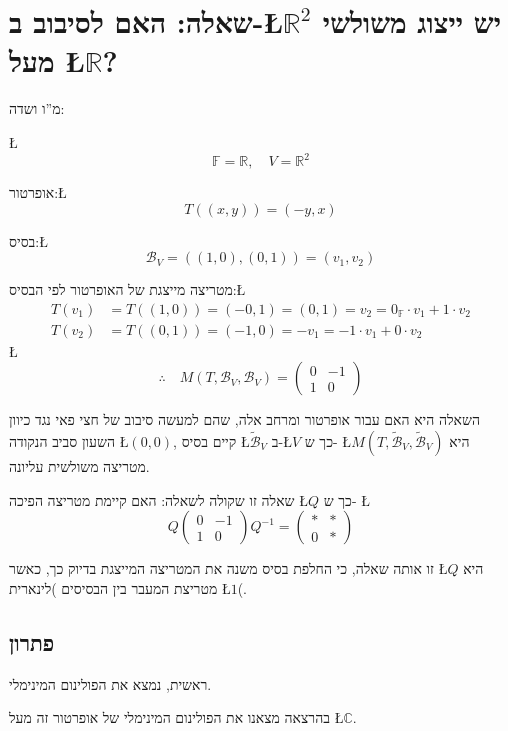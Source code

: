 \documentclass[english,hebrew]{article}
\begin{document}
\section{שאלה: האם לסיבוב ב-\L{$\mathbb{R}^{2}$} יש ייצוג משולשי מעל \L{$\mathbb{R}$}?}

מ\textquotedblright ו ושדה:

\L{%
\[
\mathbb{F}=\mathbb{R},\quad V=\mathbb{R}^{2}
\]
}%

אופרטור:\L{%
\[
T((x,y))=(-y,x)
\]
}%

בסיס:\L{%
\[
\mathcal{B}_{V}=((1,0),(0,1))=(v_{1},v_{2})
\]
}%

מטריצה מייצגת של האופרטור לפי הבסיס:\L{%
\begin{align*}
T(v_{1}) & =T\left((1,0)\right)=\left(-0,1\right)=\left(0,1\right)=v_{2}=0_{\mathbb{F}}\cdot v_{1}+1\cdot v_{2}\\
T(v_{2}) & =T\left((0,1)\right)=\left(-1,0\right)=-v_{1}=-1\cdot v_{1}+0\cdot v_{2}
\end{align*}
}%
\L{%
\[
\therefore\quad M(T,\mathcal{B}_{V},\mathcal{B}_{V})=\begin{pmatrix}0 & -1\\
1 & 0
\end{pmatrix}
\]
}%

השאלה היא האם עבור אופרטור ומרחב אלה, שהם למעשה סיבוב של חצי פאי נגד
כיוון השעון סביב הנקודה \L{$\left(0,0\right)$}, קיים בסיס \L{$\widetilde{\mathcal{B}}_{V}$}
ב-\L{$V$} כך ש- \L{$M(T,\widetilde{\mathcal{B}}_{V},\widetilde{\mathcal{B}}_{V})$}
היא מטריצה משולשית עליונה.

שאלה זו שקולה לשאלה: האם קיימת מטריצה הפיכה \L{$Q$} כך ש- \L{%
\[
Q\begin{pmatrix}0 & -1\\
1 & 0
\end{pmatrix}Q^{-1}=\begin{pmatrix}* & *\\
0 & *
\end{pmatrix}
\]
}%

זו אותה שאלה, כי החלפת בסיס משנה את המטריצה המייצגת בדיוק כך, כאשר
\L{$Q$} היא מטריצת המעבר בין הבסיסים )לינארית \L{$1$}(.

\subsection{פתרון}

ראשית, נמצא את הפולינום המינימלי.

בהרצאה {\endL} מצאנו את הפולינום המינימלי של אופרטור זה מעל
\L{$\mathbb{C}$}.
\end{document}
